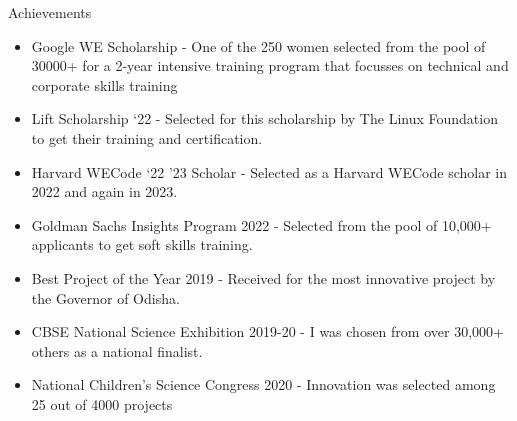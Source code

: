 \documentclass{resume}
\begin{document}

\vspace{-0.78em}

\begin{rSection}{Achievements} 
\begin{itemize}
    \item 	Google WE Scholarship - One of the 250 women selected from the pool of 30000+ for a 2-year intensive training program that focusses on technical and corporate skills training
    
    \vspace{-0.5em}
    
    \item	Lift Scholarship ‘22 - Selected for this scholarship by The Linux Foundation to get their training and certification.

    \vspace{-0.5em}
    
    \item	Harvard WECode ‘22 '23 Scholar - Selected as a Harvard WECode scholar in 2022 and again in 2023.

    \vspace{-0.5em}
    
    \item	Goldman Sachs Insights Program 2022 - Selected from the pool of 10,000+ applicants to get soft skills training.

    \vspace{-0.5em}
    
    \item	Best Project of the Year 2019 - Received for the most innovative project by the Governor of Odisha.
    
    \vspace{-0.5em}
    
    \item	CBSE National Science Exhibition 2019-20 - I was chosen from over 30,000+ others as a national finalist.

    \vspace{-0.5em}
    
    \item	National Children's Science Congress 2020 - Innovation was selected among 25 out of 4000 projects
    
\end{itemize}
\end{rSection}

\end{document}
